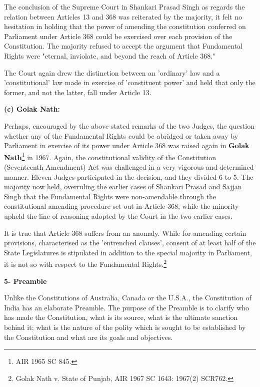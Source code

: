 \begin{multicols}{2}
\vspace{-.15cm}

\noi
The conclusion of the Supreme Court in Shankari Prasad Singh as regards the relation between
Articles 13 and 368 was reiterated by the majority, it felt no hesitation in holding that the power
of amending the constitution conferred on Parliament under Article 368 could be exercised over
each provision of the Constitution. The majority refused to accept the argument that Fundamental
Rights were "eternal, inviolate, and beyond the reach of Article 368."

\vspace{-.15cm}

\noi
The Court again drew the distinction between an 'ordinary' law and a 'constitutional' law made in
exercise of 'constituent power' and held that only the former, and not the latter, fall under Article 13.

\noi
{\large \bfseries (c) Golak Nath:}

\noi
Perhaps, encouraged by the above stated remarks of the two Judges, the question whether any of
the Fundamental Rights could be abridged or taken away by Parliament in exercise of its power
under Article 368 was raised again in \textbf{Golak Nath}\footnote{AIR 1965 SC 845.} in 1967. Again, the constitutional validity of
the Constitution (Seventeenth Amendment) Act was challenged in a very vigorous and
determined manner. Eleven Judges participated in the decision, and they divided 6 to 5. The
majority now held, overruling the earlier cases of Shankari Prasad and Sajjan Singh that the
Fundamental Rights were non-amendable through the constitutional amending procedure set out
in Article 368, while the minority upheld the line of reasoning adopted by the Court in the two
earlier cases.

\noi
It is true that Article 368 suffers from an anomaly. While for amending certain provisions,
characterised as the 'entrenched clauses', consent of at least half of the State Legislatures is
stipulated in addition to the special majority in Parliament, it is not so with respect to the
Fundamental Rights.\footnote{Golak Nath v. State of Punjab, AIR 1967 SC 1643: 1967(2) SCR762.}

\noi
{\large \bfseries 5- Preamble}

\noi
Unlike the Constitutions of Australia, Canada or the U.S.A., the Constitution of India has an
elaborate Preamble. The purpose of the Preamble is to clarify who has made the Constitution,
what is its source, what is the ultimate sanction behind it; what is the nature of the polity which
is sought to be established by the Constitution and what are its goals and objectives.


\end{multicols}
